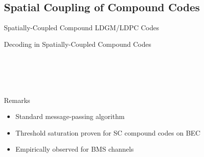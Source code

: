 \documentclass[10pt]{beamer}
\def\side_information_path{../compound-codes/isit14/slides/Figures}
\begin{document}
\subsection{Spatial Coupling of Compound Codes}
\begin{frame}{Spatially-Coupled Compound LDGM/LDPC Codes}
  \begin{center}
    \scalebox{0.8}{}
  \end{center}
\end{frame}

\begin{frame}{Decoding in Spatially-Coupled Compound Codes}
  \begin{columns}
    \setlength\tikzheight{5cm}
    \setlength\tikzwidth{6cm}
    \scalebox{0.5}{}

    \scalebox{0.5}{}\\ \vspace{0.3cm}
    \scalebox{0.5}{}\\ \vspace{0.3cm}
    \scalebox{0.5}{}
  \end{columns}
  \begin{block}{Remarks}
    \begin{itemize}
    \item Standard message-passing algorithm
    \item Threshold saturation proven for SC compound codes on BEC
    \item Empirically observed for BMS channels
    \end{itemize}
  \end{block}
\end{frame}
\end{document}
